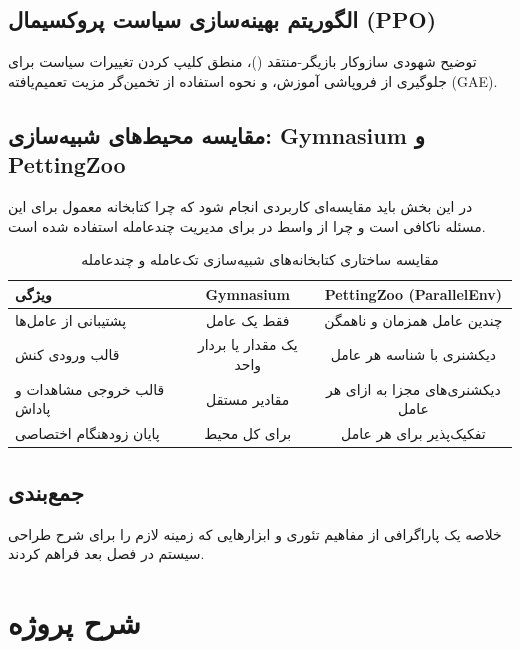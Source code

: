 \documentclass[a4paper,12pt,oneside]{report}
\begin{document}
\section{الگوریتم بهینه‌سازی سیاست پروکسیمال (PPO)}
توضیح شهودی سازوکار بازیگر-منتقد ()، منطق کلیپ کردن تغییرات سیاست برای جلوگیری از فروپاشی آموزش، و نحوه استفاده از تخمین‌گر مزیت تعمیم‌یافته (\gls{GAE}).

\section{مقایسه محیط‌های شبیه‌سازی: Gymnasium و PettingZoo}
در این بخش باید مقایسه‌ای کاربردی انجام شود که چرا کتابخانه معمول  برای این مسئله ناکافی است و چرا از واسط  در  برای مدیریت چندعامله استفاده شده است.

\begin{table}[H]
    \centering
    \caption{مقایسه ساختاری کتابخانه‌های شبیه‌سازی تک‌عامله و چندعامله}
    \label{tab:gym_vs_pettingzoo}
    \begin{tabular}{lcc}
        \toprule
        \textbf{ویژگی} & \textbf{Gymnasium} & \textbf{PettingZoo (ParallelEnv)} \\
        \midrule
        پشتیبانی از عامل‌ها & فقط یک عامل & چندین عامل همزمان و ناهمگن \\
        قالب ورودی کنش & یک مقدار یا بردار واحد & دیکشنری با شناسه هر عامل \\
        قالب خروجی مشاهدات و پاداش & مقادیر مستقل & دیکشنری‌های مجزا به ازای هر عامل \\
        پایان زودهنگام اختصاصی & برای کل محیط & تفکیک‌پذیر برای هر عامل \\
        \bottomrule
    \end{tabular}
\end{table}

\section{جمع‌بندی}
خلاصه یک پاراگرافی از مفاهیم تئوری و ابزارهایی که زمینه لازم را برای شرح طراحی سیستم در فصل بعد فراهم کردند.

\chapter{شرح پروژه}
\end{document}
